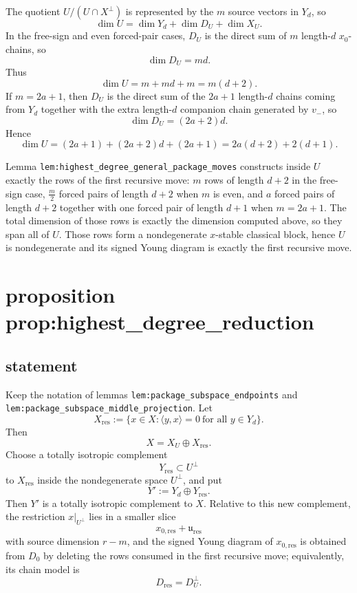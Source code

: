 \documentclass[
]{article}
\begin{document}
The quotient \(U/(U\cap X^\perp)\) is represented by the \(m\) source
vectors in \(Y_d\), so \[
\dim U=\dim Y_d+\dim D_U+\dim X_U.
\] In the free-sign and even forced-pair cases, \(D_U\) is the direct
sum of \(m\) length-\(d\) \(x_0\)-chains, so \[
\dim D_U=md.
\] Thus \[
\dim U=m+md+m=m(d+2).
\] If \(m=2a+1\), then \(D_U\) is the direct sum of the \(2a+1\)
length-\(d\) chains coming from \(Y_d\) together with the extra
length-\(d\) companion chain generated by \(v_-\), so \[
\dim D_U=(2a+2)d.
\] Hence \[
\dim U=(2a+1)+(2a+2)d+(2a+1)=2a(d+2)+2(d+1).
\]

Lemma \texttt{lem:highest\_degree\_general\_package\_moves} constructs
inside \(U\) exactly the rows of the first recursive move: \(m\) rows of
length \(d+2\) in the free-sign case, \(\frac m2\) forced pairs of
length \(d+2\) when \(m\) is even, and \(a\) forced pairs of length
\(d+2\) together with one forced pair of length \(d+1\) when \(m=2a+1\).
The total dimension of those rows is exactly the dimension computed
above, so they span all of \(U\). Those rows form a nondegenerate
\(x\)-stable classical block, hence \(U\) is nondegenerate and its
signed Young diagram is exactly the first recursive move.

\section{proposition
prop:highest\_degree\_reduction}\label{proposition-prophighest_degree_reduction}

\subsection{statement}\label{statement-18}

Keep the notation of lemmas \texttt{lem:package\_subspace\_endpoints}
and \texttt{lem:package\_subspace\_middle\_projection}. Let \[
X_{\mathrm{res}}:=\{x\in X:\langle y,x\rangle=0\ \text{for all }y\in Y_d\}.
\] Then \[
X=X_U\oplus X_{\mathrm{res}}.
\] Choose a totally isotropic complement \[
Y_{\mathrm{res}}\subset U^\perp
\] to \(X_{\mathrm{res}}\) inside the nondegenerate space \(U^\perp\),
and put \[
Y':=Y_d\oplus Y_{\mathrm{res}}.
\] Then \(Y'\) is a totally isotropic complement to \(X\). Relative to
this new complement, the restriction \(x|_{U^\perp}\) lies in a smaller
slice \[
x_{0,\mathrm{res}}+\mathfrak u_{\mathrm{res}}
\] with source dimension \(r-m\), and the signed Young diagram of
\(x_{0,\mathrm{res}}\) is obtained from \(D_0\) by deleting the rows
consumed in the first recursive move; equivalently, its chain model is
\[
D_{\mathrm{res}}=D_U^\perp.
\]
\end{document}
